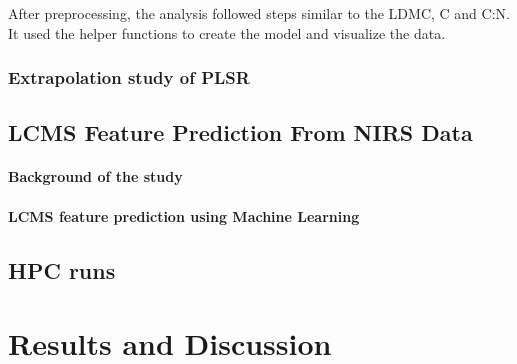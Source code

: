 \documentclass[12pt,a4paper]{report}
\begin{document}
After preprocessing, the analysis followed steps similar to the LDMC, C and C:N. It used the helper functions to create the model and visualize the data. 

\subsection{Extrapolation study of PLSR}

\section{LCMS Feature Prediction From NIRS Data}
\subsubsection*{Background of the study}
\subsubsection*{LCMS feature prediction using Machine Learning}
\section{HPC runs}


\chapter{Results and Discussion}
\end{document}
